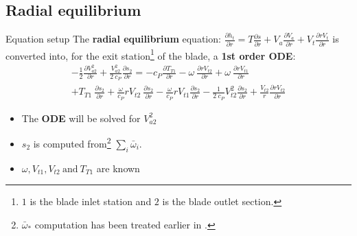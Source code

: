 \subsection{Radial equilibrium}
	\begin{frame}{Equation setup}
		The \textbf{radial equilibrium} equation: $\frac{\partial h_t}{\partial r} = T \frac{\partial s}{\partial r} + V_a \frac{\partial V_a}{\partial r} + V_t \frac{\partial r V_t}{\partial r}$ is converted into, for the exit station\footnote{$1$ is the blade inlet station and $2$ is the blade outlet section.} of the blade, a \textbf{1st order ODE}:
		\begin{equation}
			\begin{split}
				- \frac{1}{2} \frac{\partial V_{a2}^2}{\partial r} + \frac{V_{a2}^2}{2 \ c_P} \frac{\partial s_{2}}{\partial r} = - c_P \frac{\partial T_{T1}}{\partial r} - \omega \ \frac{\partial r V_{t2}}{\partial r} + \omega \ \frac{\partial r V_{t1}}{\partial r} \\ + T_{T1} \ \frac{\partial s_2}{\partial r} + \frac{\omega}{c_P} r V_{t2} \ \frac{\partial s_2}{\partial r} - \frac{\omega}{c_P} r V_{t1} \frac{\partial s_2}{\partial r} - \frac{1}{2 \ c_P} V_{t2}^2 \frac{\partial s_2}{\partial r} + \frac{V_{t2}}{r} \frac{\partial r V_{t2}}{\partial r}	
			\nonumber
			\end{split}
		\end{equation}
		\begin{itemize}
			\item The \textbf{ODE} will be solved for $V_{a2}^2$ 
			\item $s_2$ is computed from\footnote{$\bar{\omega}_{*}$ computation has been treated earlier in \hyperlink{lossesModeling}{{\color{blue} }}.} $\sum_i \bar{\omega}_{i}$.  
			\item $\omega, V_{t1}, V_{t2} \ \text{and} \ T_{T1}$ are known
		\end{itemize}
	\end{frame}
	
